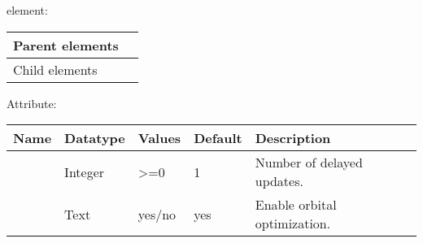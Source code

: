 \documentclass[letterpaper,10pt,english]{sphinxmanual}
\begin{document}
 element:


\begin{savenotes}\sphinxattablestart
\centering
{}\label{\detokenize{intro_wavefunction:table2}}\nobreak
\begin{tabulary}{\linewidth}[t]{|T|T|}
\hline

Parent elements
&
\\
\hline
Child elements
&
\\
\hline
\end{tabulary}
\par
\sphinxattableend\end{savenotes}

Attribute:


\begin{savenotes}\sphinxattablestart
\centering
\begin{tabulary}{\linewidth}[t]{|T|T|T|T|T|}
\hline
\sphinxstyletheadfamily 
Name
&\sphinxstyletheadfamily 
Datatype
&\sphinxstyletheadfamily 
Values
&\sphinxstyletheadfamily 
Default
&\sphinxstyletheadfamily 
Description
\\
\hline
{}
&
Integer
&
\textgreater{}=0
&
1
&
Number of delayed updates.
\\
\hline
{}
&
Text
&
yes/no
&
yes
&
Enable orbital optimization.
\\
\hline
\end{tabulary}
\par
\sphinxattableend\end{savenotes}
\end{document}

